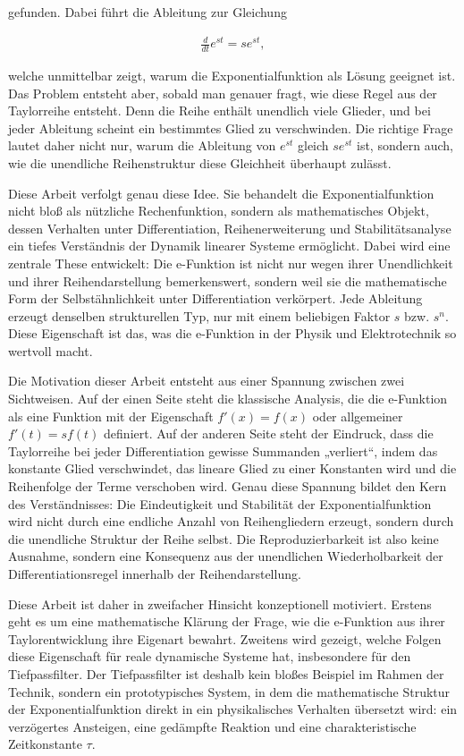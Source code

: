 \documentclass[a4paper,12pt,twoside]{report}
\theoremstyle{definition}
\begin{document}
gefunden. Dabei führt die Ableitung zur Gleichung

\begin{align}
    \frac{d}{dt} e^{st} = s e^{st},
\end{align}

welche unmittelbar zeigt, warum die Exponentialfunktion als Lösung geeignet ist. Das Problem entsteht aber, sobald man genauer fragt, wie diese Regel aus der Taylorreihe entsteht. Denn die Reihe enthält unendlich viele Glieder, und bei jeder Ableitung scheint ein bestimmtes Glied zu verschwinden. Die richtige Frage lautet daher nicht nur, warum die Ableitung von $e^{st}$ gleich $s e^{st}$ ist, sondern auch, wie die unendliche Reihenstruktur diese Gleichheit überhaupt zulässt.

Diese Arbeit verfolgt genau diese Idee. Sie behandelt die Exponentialfunktion nicht bloß als nützliche Rechenfunktion, sondern als mathematisches Objekt, dessen Verhalten unter Differentiation, Reihenerweiterung und Stabilitätsanalyse ein tiefes Verständnis der Dynamik linearer Systeme ermöglicht. Dabei wird eine zentrale These entwickelt: Die e-Funktion ist nicht nur wegen ihrer Unendlichkeit und ihrer Reihendarstellung bemerkenswert, sondern weil sie die mathematische Form der Selbstähnlichkeit unter Differentiation verkörpert. Jede Ableitung erzeugt denselben strukturellen Typ, nur mit einem beliebigen Faktor $s$ bzw. $s^n$. Diese Eigenschaft ist das, was die e-Funktion in der Physik und Elektrotechnik so wertvoll macht.

Die Motivation dieser Arbeit entsteht aus einer Spannung zwischen zwei Sichtweisen. Auf der einen Seite steht die klassische Analysis, die die e-Funktion als eine Funktion mit der Eigenschaft $f'(x)=f(x)$ oder allgemeiner $f'(t)=s f(t)$ definiert. Auf der anderen Seite steht der Eindruck, dass die Taylorreihe bei jeder Differentiation gewisse Summanden „verliert“, indem das konstante Glied verschwindet, das lineare Glied zu einer Konstanten wird und die Reihenfolge der Terme verschoben wird. Genau diese Spannung bildet den Kern des Verständnisses: Die Eindeutigkeit und Stabilität der Exponentialfunktion wird nicht durch eine endliche Anzahl von Reihengliedern erzeugt, sondern durch die unendliche Struktur der Reihe selbst. Die Reproduzierbarkeit ist also keine Ausnahme, sondern eine Konsequenz aus der unendlichen Wiederholbarkeit der Differentiationsregel innerhalb der Reihendarstellung.

Diese Arbeit ist daher in zweifacher Hinsicht konzeptionell motiviert. Erstens geht es um eine mathematische Klärung der Frage, wie die e-Funktion aus ihrer Taylorentwicklung ihre Eigenart bewahrt. Zweitens wird gezeigt, welche Folgen diese Eigenschaft für reale dynamische Systeme hat, insbesondere für den Tiefpassfilter. Der Tiefpassfilter ist deshalb kein bloßes Beispiel im Rahmen der Technik, sondern ein prototypisches System, in dem die mathematische Struktur der Exponentialfunktion direkt in ein physikalisches Verhalten übersetzt wird: ein verzögertes Ansteigen, eine gedämpfte Reaktion und eine charakteristische Zeitkonstante $\tau$.
\end{document}
